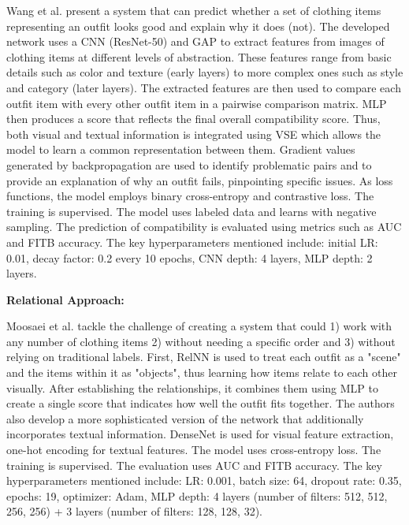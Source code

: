 Wang et al. present a system that can predict whether a set of clothing items representing an outfit looks good and explain why it does (not). The developed network uses a \acs{CNN} (\acs{ResNet}-50) and \acs{GAP} to extract features from images of clothing items at different levels of abstraction. These features range from basic details such as color and texture (early layers) to more complex ones such as style and category (later layers). The extracted features are then used to compare each outfit item with every other outfit item in a pairwise comparison matrix. \acs{MLP} then produces a score that reflects the final overall compatibility score. Thus, both visual and textual information is integrated using \acs{VSE} which allows the model to learn a common representation between them. Gradient values generated by backpropagation are used to identify problematic pairs and to provide an explanation of why an outfit fails, pinpointing specific issues. As loss functions, the model employs binary cross-entropy and contrastive loss. The training is supervised. The model uses labeled data and learns with negative sampling. The prediction of compatibility is evaluated using metrics such as \acs{AUC} and \acs{FITB} accuracy. The key hyperparameters mentioned include: initial \acs{LR}: 0.01, decay factor: 0.2 every 10 epochs, \acs{CNN} depth: 4 layers, \acs{MLP} depth: 2 layers. \cite[cf.]{wang_outfit_2019}

\vspace{0.5cm}

\textbf{Relational Approach:}

\vspace{0.5cm}

Moosaei et al. tackle the challenge of creating a system that could 1) work with any number of clothing items 2) without needing a specific order and 3) without relying on traditional labels. First, \acs{RelNN} is used to treat each outfit as a "scene" and the items within it as "objects", thus learning how items relate to each other visually. After establishing the relationships, it combines them using \acs{MLP} to create a single score that indicates how well the outfit fits together. The authors also develop a more sophisticated version of the network that additionally incorporates textual information. DenseNet is used for visual feature extraction, one-hot encoding for textual features. The model uses cross-entropy loss. The training is supervised. The evaluation uses \acs{AUC} and \acs{FITB} accuracy. The key hyperparameters mentioned include: \acs{LR}: 0.001, batch size: 64, dropout rate: 0.35, epochs: 19, optimizer: Adam, \acs{MLP} depth: 4 layers (number of filters: 512, 512, 256, 256) + 3 layers (number of filters: 128, 128, 32). \cite[cf.]{moosaei_fashion_2020}

